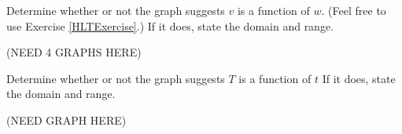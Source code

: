 \documentclass{ximera}
\begin{document}




\begin{problem}
    Determine whether or not the graph suggests $v$ is a function of $w$.  (Feel free to use Exercise \ref{HLTExercise}.)  If it does, state the domain and range.

    (NEED 4 GRAPHS HERE)
\end{problem}







\begin{problem}\label{graphfunctionfirsttT}
    Determine whether or not the graph suggests $T$ is a function of $t$  If it does, state the domain and range.

    (NEED GRAPH HERE)
\end{problem} 


\end{document}
